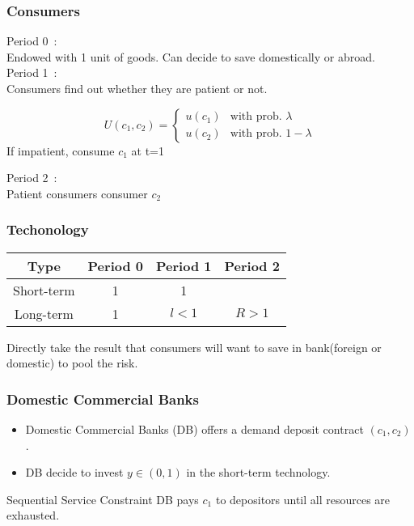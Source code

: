 \begin{frame}
    \frametitle{Consumers}

    Period 0~: \\
    Endowed with 1 unit of goods. 
    Can decide to save domestically or abroad. \\
    \vspace{2em}
    Period 1~: \\
    Consumers find out whether they are patient or not.

    \begin{equation}
        U(c_1, c_2) = \begin{cases}
            u(c_1) & \text{with prob. } \lambda \\
            u(c_2) & \text{with prob. } 1-\lambda
        \end{cases}
    \end{equation}
    If impatient, consume $c_1$ at t=1
    \\
    \vspace{2em}

    Period 2~: \\
    Patient consumers consumer $c_2$
\end{frame}

\begin{frame}
    \frametitle{Techonology}

    \begin{table}
        \begin{tabular}{cccc}
            Type & Period 0 & Period 1 & Period 2 \\
            \hline
            Short-term & 1 & 1 & \\
            
            Long-term & 1 & $l<1$ & $R>1$\\
            \hline
        \end{tabular}
    \end{table}

    Directly take the result that consumers will want to save in bank(foreign or domestic) to pool the risk.

\end{frame}

\begin{frame}
    \frametitle{Domestic Commercial Banks}

    \begin{itemize}
        \item Domestic Commercial Banks (DB) offers a demand deposit contract $(c_1, c_2)$. 
        \item DB decide to invest $y\in(0,1)$ in the short-term technology.
    \end{itemize}

    \begin{block}{Sequential Service Constraint}
        DB pays $c_1$ to depositors until all resources are exhausted.        
    \end{block}

\end{frame}

